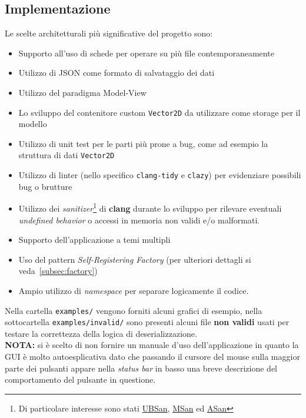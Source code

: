 \subsection{Implementazione}
Le scelte architetturali più significative del progetto sono:
\begin{itemize}
    \item Supporto all'uso di schede per operare su più file contemporaneamente
    \item Utilizzo di JSON come formato di salvataggio dei dati
    \item Utilizzo del paradigma Model-View
    \item Lo sviluppo del contenitore custom \texttt{Vector2D} da utilizzare come storage per il modello
    \item Utilizzo di unit test per le parti più prone a bug, come ad esempio la struttura di dati \texttt{Vector2D}
    \item Utilizzo di linter (nello specifico \texttt{clang-tidy} e \texttt{clazy}) per evidenziare possibili bug o brutture
    \item Utilizzo dei \textit{sanitizer}\footnote{Di particolare interesse sono stati
              \href{https://clang.llvm.org/docs/UndefinedBehaviorSanitizer.html}{UBSan},
              \href{https://clang.llvm.org/docs/MemorySanitizer.html}{MSan} ed
              \href{https://clang.llvm.org/docs/AddressSanitizer.html}{ASan}
          } di \textbf{clang} durante lo sviluppo per rilevare eventuali
          \textit{undefined behavior} o accessi in memoria non validi e/o malformati.
    \item Supporto dell'applicazione a temi multipli
    \item Uso del pattern \textit{Self-Registering Factory} (per ulteriori dettagli si veda~\ref{subsec:factory})
    \item Ampio utilizzo di \textit{namespace} per separare logicamente il codice.
\end{itemize}
Nella cartella \texttt{examples/} vengono forniti alcuni grafici di esempio, nella sottocartella
\texttt{examples/invalid/} sono presenti alcuni file \textbf{non validi} usati per testare la correttezza della logica
di deserializzazione.\\
\noindent
\textbf{NOTA:} si è scelto di non fornire un manuale d'uso dell'applicazione in quanto la GUI è molto autoesplicativa
dato che passando il cursore del mouse sulla maggior parte dei pulsanti appare nella \textit{status bar} in basso una
breve descrizione del comportamento del pulsante in questione.
